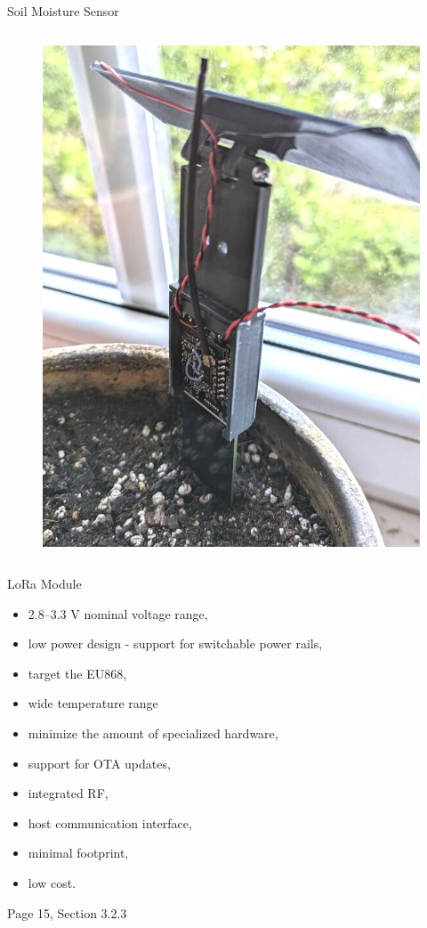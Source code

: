\documentclass{beamer}
\newcommand{\backupend}{
   \addtocounter{framenumberappendix}{-\value{framenumber}}
   \addtocounter{framenumber}{\value{framenumberappendix}} 
}
\begin{document}
\begin{frame}{Soil Moisture Sensor}
\begin{columns}[T]
\begin{column}{.5\textwidth}
\begin{figure}
        \includegraphics[width=\linewidth]{../thesis/img/sensor-deploy-close.jpg}
    \end{figure}
\end{column}
\end{columns}
\end{frame}

\begin{frame}{LoRa Module}
\begin{itemize}
    \item 2.8--3.3 V nominal voltage range,
    \item low power design - support for switchable power rails,
    \item target the EU868,
    \item wide temperature range
    \item minimize the amount of specialized hardware,
    \item support for OTA updates,
    \item integrated RF,
    \item host communication interface,
    \item minimal footprint,
    \item low cost.
\end{itemize}
\begin{flushright}
    Page 15, Section 3.2.3
\end{flushright}
\end{frame}

\backupend
\end{document}

